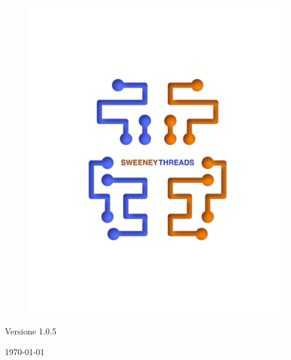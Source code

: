\documentclass[a4paper]{report}
\begin{document}
\begin{titlepage}
		\begin{figure}[H]
			\centering
			\includegraphics[scale=0.8]{sweeney.png}
		\end{figure}
		\begin{center}
			Versione 1.0.5
		\end{center}
		{\large \today}\\[3cm] 
		\vfill  
	\end{titlepage}
	
	\tableofcontents
	
\end{document}
